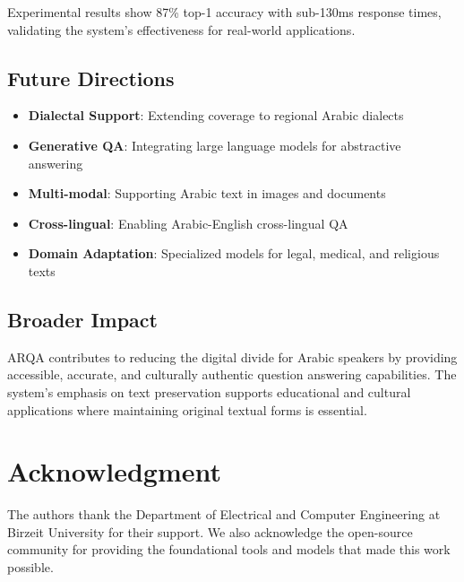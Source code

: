 \documentclass[conference]{IEEEtran}
\begin{document}
Experimental results show 87\% top-1 accuracy with sub-130ms response times, validating the system's effectiveness for real-world applications.

\subsection{Future Directions}
\begin{itemize}
    \item \textbf{Dialectal Support}: Extending coverage to regional Arabic dialects
    \item \textbf{Generative QA}: Integrating large language models for abstractive answering
    \item \textbf{Multi-modal}: Supporting Arabic text in images and documents
    \item \textbf{Cross-lingual}: Enabling Arabic-English cross-lingual QA
    \item \textbf{Domain Adaptation}: Specialized models for legal, medical, and religious texts
\end{itemize}

\subsection{Broader Impact}
ARQA contributes to reducing the digital divide for Arabic speakers by providing accessible, accurate, and culturally authentic question answering capabilities. The system's emphasis on text preservation supports educational and cultural applications where maintaining original textual forms is essential.

\section*{Acknowledgment}
The authors thank the Department of Electrical and Computer Engineering at Birzeit University for their support. We also acknowledge the open-source community for providing the foundational tools and models that made this work possible.
\end{document}

